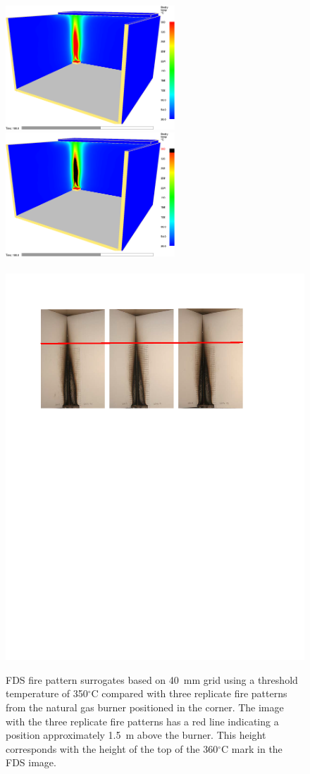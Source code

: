 \documentclass[twoside]{uocthesis}
\begin{document}
{\begin{figure}[h]
  \centering
  \includegraphics[width=2.5in]{../Figures/10}
  \includegraphics[width=2.5in]{../Figures/11}\\
  \hspace{4 mm}  \\ 
  \includegraphics[width=.8\columnwidth]{../Figures/NGCorner_guideline}\\
  \caption[FDS fire pattern surrogates based on 40~mm grid using a threshold temperature of 360$^\circ$C compared with three replicate fire patterns from the natural gas burner positioned in the corner]{FDS fire pattern surrogates based on 40~mm grid using a threshold temperature of 350$^\circ$C compared with three replicate fire patterns from the natural gas burner positioned in the corner.  The image with the three replicate fire patterns has a red line indicating a position approximately 1.5~m above the burner.  This height corresponds with the height of the top of the 360$^\circ$C mark in the FDS image.}
  \label{FDS_FirePattern_Corner_comp}
\end{figure}

}
\end{document}

